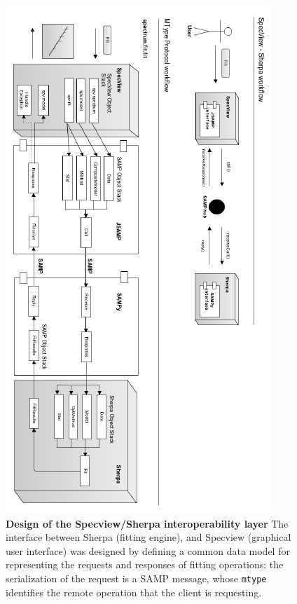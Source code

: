 \documentclass[5p]{elsarticle}
\begin{document}
\begin{figure}
\label{fig:sherpasamp}
\begin{center} 
\includegraphics[width=\columnwidth]{figures/sherpasamp.png}
\caption{\textbf{Design of the Specview/Sherpa interoperability layer} The interface between Sherpa (fitting engine), and Specview (graphical user interface) was designed by defining a common data model for representing the requests and responses of fitting operations: the serialization of the request is a SAMP message, whose \texttt{mtype} identifies the remote operation that the client is requesting.}
\end{center}
\end{figure}
\end{document}
